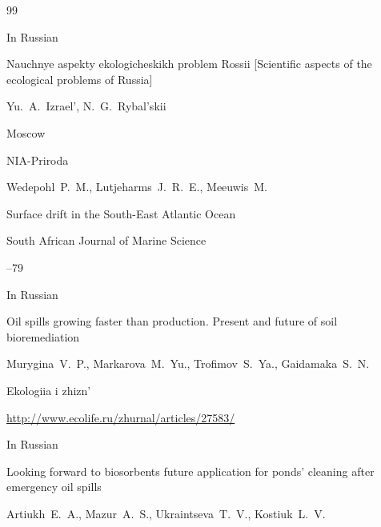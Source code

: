 \EngRef







\begin{thebibliography}{99}




\lang In Russian

\book Nauchnye aspekty ekologicheskikh problem Rossii \rm [Scientific aspects of the ecological problems of Russia]

\ed Yu.~A.~Izrael', N.~G.~Rybal'skii

\publaddr Moscow

\publ NIA-Priroda






\by Wedepohl~P.~M., Lutjeharms~J.~R.~E.,  Meeuwis~M.


\paper  Surface drift in the South-East Atlantic Ocean 

\jour  South African Journal of Marine Science



--79





\lang In Russian

\paper Oil spills growing faster than production. Present and future  of soil bioremediation

\by Murygina~V.~P., Markarova~M.~Yu., Trofimov~S.~Ya., Gaidamaka~S.~N.

\jour Ekologiia i zhizn'


\issueinfo

\url{http://www.ecolife.ru/zhurnal/articles/27583/}




\lang In Russian

\paper Looking forward to biosorbents future application for ponds' cleaning after emergency oil spills

\by Artiukh~E.~A., Mazur~A.~S., Ukraintseva~T.~V., Kostiuk~L.~V.


\end{thebibliography}
